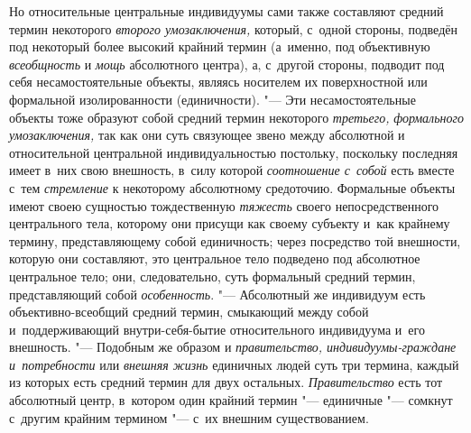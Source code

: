 Но относительные центральные индивидуумы сами также составляют
средний термин некоторого {\em второго
умозаключения,} который, с~одной стороны, подведён под
некоторый более высокий крайний термин (а~именно, под объективную
{\em всеобщность} и {\em мощь} абсолютного
центра), а, с~другой стороны, подводит под себя несамостоятельные объекты,
являясь носителем их поверхностной или формальной изолированности
(единичности).
"--- Эти несамостоятельные объекты тоже образуют
собой средний термин некоторого
{\em третьего,}
{\em формального умозаключения,}
так как они суть связующее звено между абсолютной и
относительной центральной индивидуальностью постольку, поскольку последняя
имеет в~них свою внешность, в~силу которой
{\em соотношение с~собой}
есть вместе с~тем
{\em стремление} к
некоторому абсолютному средоточию. Формальные объекты имеют своею сущностью
тождественную {\em тяжесть}
своего непосредственного центрального тела, которому они
присущи как своему субъекту и~как крайнему термину, представляющему собой
единичность; через посредство той внешности, которую они составляют, это
центральное тело подведено под абсолютное центральное тело; они,
следовательно, суть формальный средний термин, представляющий собой
{\em особенность}.
"--- Абсолютный же индивидуум есть объективно-всеобщий средний
термин, смыкающий между собой и~поддерживающий внутри-себя-бытие
относительного индивидуума и~его
внешность.
"--- \label{bkm:bm52b}Подобным же образом и
{\em правительство, индивидуумы-граждане и~потребности} или {\em внешняя жизнь}
единичных людей суть три термина, каждый из которых есть
средний термин для двух остальных.
{\em Правительство} есть
тот абсолютный центр, в~котором один крайний термин
"--- единичные "--- сомкнут с~другим крайним
термином "--- с~их внешним
существованием.
